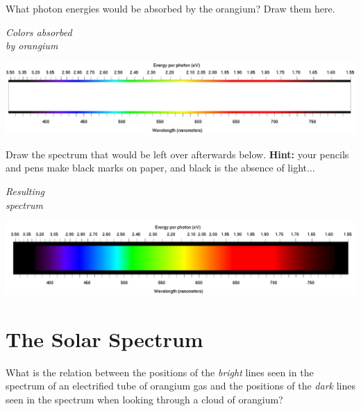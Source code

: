 \documentclass[12pt]{article}
\begin{document}
What photon energies would be absorbed by the orangium? Draw them here.

\begin{minipage}{0.15\textwidth}
	\begin{center}	\it Colors absorbed\\
		by orangium\end{center}
\end{minipage}
\begin{minipage}{0.8\textwidth}
	\includegraphics[width=5.5in]{spectrum-blank.png}
\end{minipage}

Draw the spectrum that would be left over afterwards below. {\bf Hint:} your pencils and pens make black marks on paper, and black is the absence of light...

\begin{minipage}{0.15\textwidth}
	\begin{center}	\it Resulting \\ spectrum\end{center}
\end{minipage}
\begin{minipage}{0.8\textwidth}
	\includegraphics[width=5.5in]{spectrum-continuous.png}
\end{minipage}

\section{The Solar Spectrum}

What is the relation between the positions of the {\it bright} lines seen in the spectrum of an electrified tube of orangium gas and the positions of the {\it dark} lines seen in the spectrum when looking through a cloud of orangium?

\vspace{0.5in}
\end{document}

